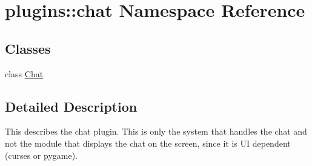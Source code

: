 \hypertarget{namespaceplugins_1_1chat}{\section{plugins\-:\-:chat \-Namespace \-Reference}
\label{namespaceplugins_1_1chat}
}
\subsection*{\-Classes}
\begin{DoxyCompactItemize}
\item 
class \hyperlink{classplugins_1_1chat_1_1_chat}{\-Chat}
\end{DoxyCompactItemize}


\subsection{\-Detailed \-Description}
\begin{DoxyVerb}
This describes the chat plugin.
This is only the system that handles the chat and not the module
that displays the chat on the screen, since it is UI dependent (curses or pygame).
\end{DoxyVerb}
 